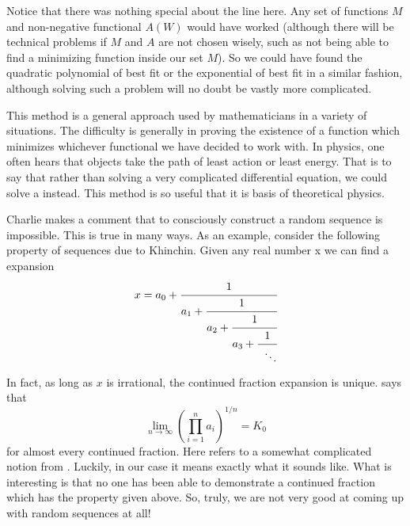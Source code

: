 Notice that there was nothing special about the line here. Any set of functions $M$ and non-negative functional $A(W)$ would have worked (although there will be technical problems if $M$ and $A$ are not chosen wisely, such as not being able to find a minimizing function inside our set $M$). So we could have found the quadratic polynomial of best fit or the exponential of best fit in a similar fashion, although solving such a problem will no doubt be vastly more complicated.


This method is a general approach used by mathematicians in a variety of situations. The difficulty is generally in proving the existence of a function which minimizes whichever functional we have decided to work with. In physics, one often hears that objects take the path of least action or least energy. That is to say that rather than solving a very complicated differential equation, we could solve a  instead. This method is so useful that it is basis of theoretical physics.




Charlie makes a comment that to consciously construct a random sequence is impossible. This is true in many ways. As an example, consider the following property of sequences due to Khinchin. Given any real number x we can find a  expansion
	\[ 
	x= a_0+ \cfrac{1}{a_1+\cfrac{1}{a_2+\cfrac{1}{a_3+\cfrac{1}{\;\;\ddots}}}}
	\]

In fact, as long as $x$ is irrational, the continued fraction expansion is unique.  says that
	\[ 
	\lim_{n \to \infty} \left( \prod_{i=1}^n a_i \right)^{1/n} = K_0 
	\]
for almost every continued fraction. Here  refers to a somewhat complicated notion from . Luckily, in our case it means exactly what it sounds like. What is interesting is that no one has been able to demonstrate a continued fraction which has the property given above. So, truly, we are not very good at coming up with random sequences at all!


